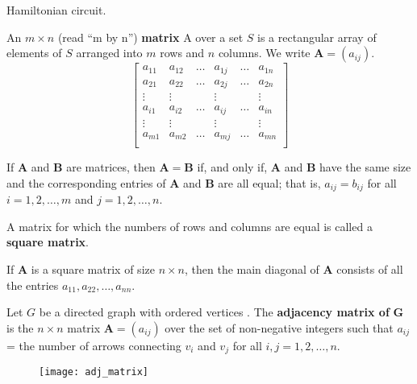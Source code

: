 \documentclass{article}
\begin{document}
\begin{description}
Hamiltonian circuit.
	\item[Matrix]An $m\times n$ (read ``m by n'') \textbf{matrix} A over a set $S$ is a rectangular array of elements of $S$ arranged into $m$ rows and $n$ columns. We write $\mathbf{A}=(a_{ij})$.
	\[
	\begin{bmatrix}
		a_{11} & a_{12} & \dots & a_{1j} & \dots & a_{1n} \\
		a_{21} & a_{22} & \dots & a_{2j} & \dots & a_{2n} \\
		\vdots & \vdots &   \   & \vdots &   \   & \vdots \\
		a_{i1} & a_{i2} & \dots & a_{ij} & \dots & a_{in} \\
		\vdots & \vdots &   \   & \vdots &   \   & \vdots \\
		a_{m1} & a_{m2} & \dots & a_{mj} & \dots & a_{mn} \\
	\end{bmatrix}
	\]
	\item \qquad If \textbf{A} and \textbf{B} are matrices, then $\mathbf{A} = \mathbf{B}$ if, and only if, \textbf{A} and \textbf{B} have the same size and the corresponding entries of \textbf{A} and \textbf{B} are all equal; that is, $a_{ij}=b_{ij}$ for all $i=1,2,\dots,m$ and $j=1,2,\dots,n$.
	\item \qquad A matrix for which the numbers of rows and columns are equal is called a \textbf{square matrix}.
	\item \qquad If \textbf{A} is a square matrix of size $n\times n$, then the main diagonal of \textbf{A} consists of all the entries $a_{11},a_{22},\dots,a_{nn}$.
	
    \item[Adjacency Matrix of a Directed Graph] Let $G$ be a directed graph with ordered vertices . The \textbf{adjacency matrix of} $\mathbf{G}$ is the $n\times n$ matrix $\mathbf{A}=(a_{ij})$ over the set of non-negative integers such that $a_{ij}$ = the number of arrows connecting $v_{i}$ and $v_{j}$ for all $i, j = 1, 2, \dots, n$.
    
		\begin{figure}[H]
			\centering
			\texttt{[image: adj\_matrix]}
		\end{figure}
    

\end{description}
\end{document}
